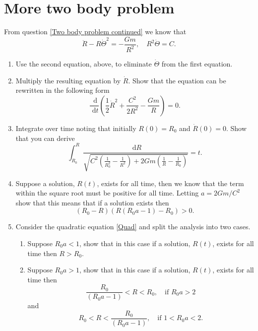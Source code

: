 \documentclass[]{article}
\newcommand{\bb}{\begin{equation}}
\newcommand{\ee}{\end{equation}}
\newcommand{\rd}{\text{ d}}
\newcommand{\eqn}[1]{equation \eqref{#1}}
\renewcommand{\l}{\left(}
\renewcommand{\r}{\right)}
\begin{document}
\section{More two body problem}
From question \ref{Two body problem continued} we know that 
\bb
\ddot{R}-R\dot{\Theta}^2=-\frac{Gm}{R^2},\quad R^2\dot{\Theta}=C.
\ee
\begin{enumerate}
\item Use the second equation, above, to eliminate $\dot{\Theta}$ from the first equation.
\item Multiply the resulting equation by $\dot{R}$. Show that the equation can be rewritten in the following form
\bb
\frac{\rd}{\rd t}\l\frac{1}{2}\dot{R}^2+\frac{C^2}{2R^2}-\frac{Gm}{R}\r=0.
\ee
\item Integrate over time noting that initially $R(0)=R_0$ and $\dot{R}(0)=0$. Show that you can derive
\bb
\int^R_{R_0}\frac{\rd R}{\sqrt{C^2\l\frac{1}{R_0^2}-\frac{1}{R^2}\r+2Gm\l\frac{1}{R}-\frac{1}{R_0}\r}}=t.
\ee
\item Suppose a solution, $R(t)$, exists for all time, then we know that the term within the square root must be positive for all time. Letting $a=2Gm/C^2$ show that this means that if a solution exists then
\bb
(R_0-R)(R(R_0a-1)-R_0)>0.\label{Quad}
\ee
\item Consider the quadratic \eqn{Quad} and split the analysis into two cases.
\begin{enumerate}
\item Suppose $R_0a<1$, show that in this case if a solution, $R(t)$, exists for all time then $R>R_0$.
\item Suppose $R_0a>1$, show that in this case if a solution, $R(t)$, exists for all time then
\bb
\frac{R_0}{(R_0a-1)}<R<R_0, \quad \textrm{if $R_0a>2$} 
\ee
 and
\bb
R_0<R<\frac{R_0}{(R_0a-1)},\quad \textrm{if $1<R_0a<2$.}
\ee
\end{enumerate}
\end{enumerate}
\end{document}
